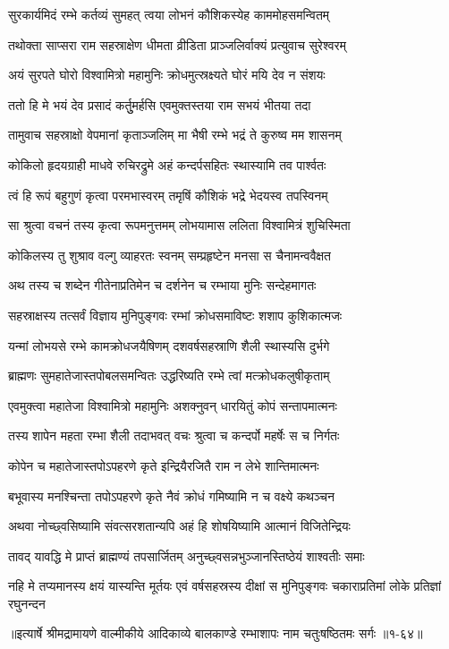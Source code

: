 
\twolineshloka
{सुरकार्यमिदं रम्भे कर्तव्यं सुमहत् त्वया}
{लोभनं कौशिकस्येह काममोहसमन्वितम्} %

\twolineshloka
{तथोक्ता साप्सरा राम सहस्राक्षेण धीमता}
{व्रीडिता प्राञ्जलिर्वाक्यं प्रत्युवाच सुरेश्वरम्} %

\twolineshloka
{अयं सुरपते घोरो विश्वामित्रो महामुनिः}
{क्रोधमुत्स्रक्ष्यते घोरं मयि देव न संशयः} %

\twolineshloka
{ततो हि मे भयं देव प्रसादं कर्तुुमर्हसि}
{एवमुक्तस्तया राम सभयं भीतया तदा} %

\twolineshloka
{तामुवाच सहस्राक्षो वेपमानां कृताञ्जलिम्}
{मा भैषी रम्भे भद्रं ते कुरुष्व मम शासनम्} %

\twolineshloka
{कोकिलो हृदयग्राही माधवे रुचिरद्रुमे}
{अहं कन्दर्पसहितः स्थास्यामि तव पार्श्वतः} %

\twolineshloka
{त्वं हि रूपं बहुगुणं कृत्वा परमभास्वरम्}
{तमृषिं कौशिकं भद्रे भेदयस्व तपस्विनम्} %

\twolineshloka
{सा श्रुत्वा वचनं तस्य कृत्वा रूपमनुत्तमम्}
{लोभयामास ललिता विश्वामित्रं शुचिस्मिता} %

\twolineshloka
{कोकिलस्य तु शुश्राव वल्गु व्याहरतः स्वनम्}
{सम्प्रहृष्टेन मनसा स चैनामन्ववैक्षत} %

\twolineshloka
{अथ तस्य च शब्देन गीतेनाप्रतिमेन च}
{दर्शनेन च रम्भाया मुनिः सन्देहमागतः} %

\twolineshloka
{सहस्राक्षस्य तत्सर्वं विज्ञाय मुनिपुङ्गवः}
{रम्भां क्रोधसमाविष्टः शशाप कुशिकात्मजः} %

\twolineshloka
{यन्मां लोभयसे रम्भे कामक्रोधजयैषिणम्}
{दशवर्षसहस्राणि शैली स्थास्यसि दुर्भगे} %

\twolineshloka
{ब्राह्मणः सुमहातेजास्तपोबलसमन्वितः}
{उद्धरिष्यति रम्भे त्वां मत्क्रोधकलुषीकृताम्} %

\twolineshloka
{एवमुक्त्वा महातेजा विश्वामित्रो महामुनिः}
{अशक्नुवन् धारयितुं कोपं सन्तापमात्मनः} %

\twolineshloka
{तस्य शापेन महता रम्भा शैली तदाभवत्}
{वचः श्रुत्वा च कन्दर्पो महर्षेः स च निर्गतः} %

\twolineshloka
{कोपेन च महातेजास्तपोऽपहरणे कृते}
{इन्द्रियैरजितै राम न लेभे शान्तिमात्मनः} %

\twolineshloka
{बभूवास्य मनश्चिन्ता तपोऽपहरणे कृते}
{नैवं क्रोधं गमिष्यामि न च वक्ष्ये कथञ्चन} %

\twolineshloka
{अथवा नोच्छ्वसिष्यामि संवत्सरशतान्यपि}
{अहं हि शोषयिष्यामि आत्मानं विजितेन्द्रियः} %

\twolineshloka
{तावद् यावद्धि मे प्राप्तं ब्राह्मण्यं तपसार्जितम्}
{अनुच्छ्वसन्नभुञ्जानस्तिष्ठेयं शाश्वतीः समाः} %

\threelineshloka
{नहि मे तप्यमानस्य क्षयं यास्यन्ति मूर्तयः}
{एवं वर्षसहस्रस्य दीक्षां स मुनिपुङ्गवः}
{चकाराप्रतिमां लोके प्रतिज्ञां रघुनन्दन} %


॥इत्यार्षे श्रीमद्रामायणे वाल्मीकीये आदिकाव्ये बालकाण्डे रम्भाशापः नाम चतुःषष्ठितमः सर्गः ॥१-६४॥
